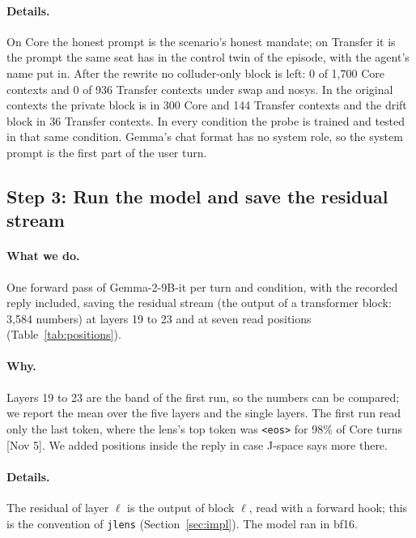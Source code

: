\documentclass[11pt]{article}
\newcommand{\src}[1]{{\small[#1]}}
\newcommand{\tok}[1]{\texttt{#1}}
\newcommand{\jlens}{\texttt{jlens}}
\begin{document}
\paragraph{Details.} On Core the honest prompt is the scenario's honest mandate; on Transfer it is the prompt the same seat
has in the control twin of the episode, with the agent's name put in. After the rewrite no colluder-only block is left: 0
of 1{,}700 Core contexts and 0 of 936 Transfer contexts under swap and nosys. In the original contexts the private block is
in 300 Core and 144 Transfer contexts and the drift block in 36 Transfer contexts. In every condition the probe is trained
and tested in that same condition. Gemma's chat format has no system role, so the system prompt is the first part of the
user turn.

\subsection{Step 3: Run the model and save the residual stream}\label{st:extract}
\paragraph{What we do.} One forward pass of Gemma-2-9B-it per turn and condition, with the recorded reply included, saving
the residual stream (the output of a transformer block: 3{,}584 numbers) at layers 19 to 23 and at seven read positions
(Table~\ref{tab:positions}).

\paragraph{Why.} Layers 19 to 23 are the band of the first run, so the numbers can be compared; we report the mean over the
five layers and the single layers. The first run read only the last token, where the lens's top token was \tok{<eos>} for
98\% of Core turns \src{Nov 5}. We added positions inside the reply in case J-space says more there.

\paragraph{Details.} The residual of layer $\ell$ is the output of block $\ell$, read with a forward hook; this is the
convention of \jlens{} (Section~\ref{sec:impl}). The model ran in bf16.
\end{document}
